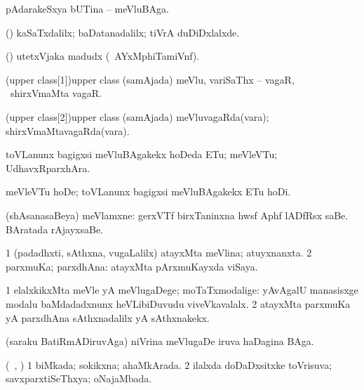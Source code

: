 \bentry
{} 
\gl{\nA}
\expl{}
\bmng
pAdarakeSxya bUTina -- meVluBAga. 
\emng

\noindent
\gl{\pagu}
\expl{}
\bmng
{} (\AmA) kaSaTxdalilx; baDatanadalilx; tiVrA duDiDxlalxde. 
\emng
\eentry

\bentry
{} 
\gl{\nA}
\expl{}
\bmng
(\ashi) utetxVjaka madudx (\kanmu\ AYxMphiTamiVnf). 
\emng
\eentry

\bentry
\word(upper class[1]){upper class} 
\pron{}
\gl{\nA}
\expl{}
\bmng
(samAjada) meVlu, variSaThx -- vagaR, \kanmu\ shirxVmaMta vagaR. 
\emng
\eentry

\bentry
\word(upper class[2]){upper class} 
\pron{}
\gl{\gu}
\expl{}
\bmng
(samAjada) meVluvagaRda(vara); shirxVmaMtavagaRda(vara). 
\emng
\eentry

\bentry
{} 
\gl{\nA}
\expl{}
\bmng
toVLanunx bagigxsi meVluBAgakekx hoDeda ETu; meVleVTu; UdhavxRparxhAra. 
\emng
\eentry

\bentry
{} 
\gl{\sakirx}
\expl{}
\bmng
meVleVTu hoDe; toVLanunx bagigxsi meVluBAgakekx ETu hoDi. 
\emng
\eentry

\bentry
{}
\gl{\nA}
\expl{}
\bmng
(shAsanasaBeya) meVlamxne: 
\banum
{} gerxVTf birxTaninxna hwsf Aphf lADfRsx saBe. 
 BAratada rAjayxsaBe. 
\eanum
\emng
\eentry

\bentry
{} 
\gl{\gu}
\bmng
\bnum
\num{1} (padadhxti, sAthxna, \mo vugaLalilx) atayxMta meVlina; atuyxnanxta. 
\num{2} parxmuKa; parxdhAna:  atayxMta pArxmuKayxda viSaya. 
\enum
\emng
\eentry

\bentry
{} 
\gl{\kirxvi}
\expl{}
\bmng
\bnum
\num{1} elalxkikxMta meVle yA meVlugaDege; moTaTxmodalige:  yAvAgalU manasisxge modalu baMdadadxnunx heVLibiDuvudu viveVkavalalx. 
\num{2} atayxMta parxmuKa yA parxdhAna sAthxnadalilx yA sAthxnakekx. 
\enum
\emng
\eentry

\bentry
{}
\gl{\nA}
\expl{}
\bmng
(saraku BatiRmADiruvAga) niVrina meVlugaDe iruva haDagina BAga. 
\emng
\eentry

\bentry
{} 
\gl{\gu}
\expl{}
\bmng
(\kanmu\ \birx, \AmA) 
\bnum
\num{1} biMkada; sokikxna; ahaMkArada. 
\num{2} ilalxda doDaDxsitxke toVrisuva; savxparxtiSeThxya; oNajaMbada. 
\enum
\emng
\eentry

